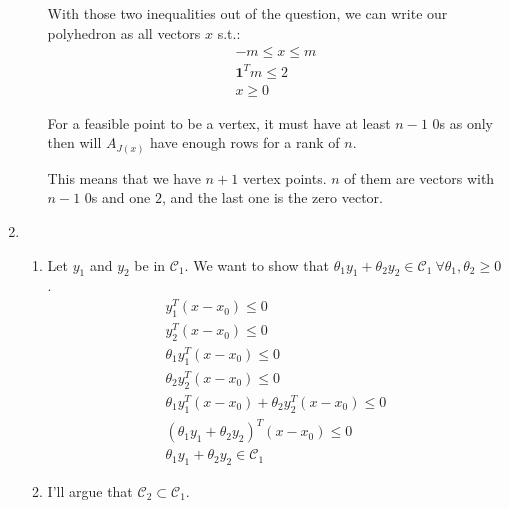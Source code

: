 \documentclass[12pt]{article}
\begin{document}
\begin{enumerate}
\begin{enumerate}
                        With those two inequalities out of the question, we can write
                        our polyhedron as all vectors $x$ s.t.:
                        \begin{gather*}
                              -m \leq x \leq m \\
                              \mathbf{1}^{T} m \leq 2 \\
                              x \geq 0
                        \end{gather*}

                        For a feasible point to be a vertex, it must have at least $n-1$ $0$s
                        as only then will $A_{J(x)}$ have enough rows for a rank of $n$.

                        This means that we have $\boxed{n+1}$ vertex points.
                        $n$ of them are vectors with $n-1$ $0$s and one $2$,
                        and the last one is the zero vector.
            \end{enumerate}
      \item \begin{enumerate}
                  \item Let $y_{1}$ and $y_{2}$ be in $\mathcal{C}_{1}$.
                        We want to show that
                        $\theta_{1} y_{1}+\theta_{2} y_{2} \in \mathcal{C}_{1}\ \forall \theta_{1}, \theta_{2} \geq 0$.
                        \begin{gather*}
                              y_{1}^{T}\left(x-x_{0}\right) \leq 0 \\
                              y_{2}^{T}\left(x-x_{0}\right) \leq 0 \\
                              \theta_{1} y_{1}^{T}\left(x-x_{0}\right) \leq 0 \\
                              \theta_{2} y_{2}^{T}\left(x-x_{0}\right) \leq 0 \\
                              \theta_{1} y_{1}^{T}\left(x-x_{0}\right)+\theta_{2} y_{2}^{T}\left(x-x_{0}\right) \leq 0 \\
                              \left(\theta_{1} y_{1}+\theta_{2} y_{2}\right)^{T}\left(x-x_{0}\right) \leq 0 \\
                              \theta_{1} y_{1}+\theta_{2} y_{2} \in \mathcal{C}_{1}
                        \end{gather*}
                  \item I'll argue that $\mathcal{C}_{2} \subset \mathcal{C}_{1}$.


\end{enumerate}
\end{enumerate}
\end{document}
